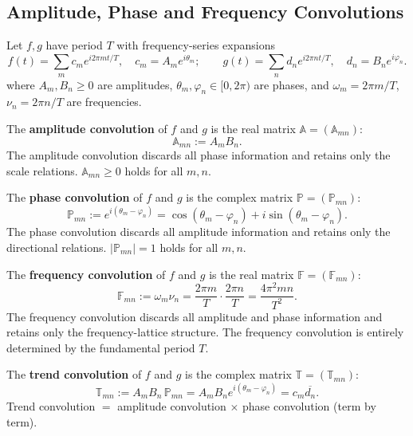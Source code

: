 \subsection{\texorpdfstring{Amplitude, Phase and Frequency Convolutions}{Amplitude, Phase and Frequency Convolutions}}

Let $f, g$ have period $T$ with frequency-series expansions
\[
f(t) = \sum_{m} c_m e^{i 2\pi m t/T}, \quad c_m = A_m e^{i\theta_m}; \qquad
g(t) = \sum_{n} d_n e^{i 2\pi n t/T}, \quad d_n = B_n e^{i\varphi_n}.
\]
where $A_m,B_n\ge 0$ are amplitudes, $\theta_m,\varphi_n\in[0,2\pi)$ are phases, and $\omega_m=2\pi m/T$, $\nu_n=2\pi n/T$ are frequencies.

\begin{definition}\label{def:amplitude_convolution}
The \textbf{amplitude convolution} of $f$ and $g$ is the real matrix $\mathbb{A} = (\mathbb{A}_{mn})$:
\[
\mathbb{A}_{mn} := A_m B_n.
\]
The amplitude convolution discards all phase information and retains only the scale relations. $\mathbb{A}_{mn} \ge 0$ holds for all $m, n$.
\end{definition}

\begin{definition}\label{def:phase_convolution}
The \textbf{phase convolution} of $f$ and $g$ is the complex matrix $\mathbb{P} = (\mathbb{P}_{mn})$:
\[
\mathbb{P}_{mn} := e^{i(\theta_m - \varphi_n)} = \cos(\theta_m - \varphi_n) + i\sin(\theta_m - \varphi_n).
\]
The phase convolution discards all amplitude information and retains only the directional relations. $|\mathbb{P}_{mn}| = 1$ holds for all $m, n$.
\end{definition}

\begin{definition}\label{def:frequency_convolution}
The \textbf{frequency convolution} of $f$ and $g$ is the real matrix $\mathbb{F} = (\mathbb{F}_{mn})$:
\[
\mathbb{F}_{mn} := \omega_m \nu_n = \frac{2\pi m}{T} \cdot \frac{2\pi n}{T} = \frac{4\pi^2 mn}{T^2}.
\]
The frequency convolution discards all amplitude and phase information and retains only the frequency-lattice structure. The frequency convolution is entirely determined by the fundamental period $T$.
\end{definition}

\begin{definition}\label{def:tendency_convolution}
The \textbf{trend convolution} of $f$ and $g$ is the complex matrix $\mathbb{T} = (\mathbb{T}_{mn})$:
\[
\mathbb{T}_{mn} := A_m B_n \, \mathbb{P}_{mn} = A_m B_n e^{i(\theta_m - \varphi_n)} = c_m \overline{d_n}.
\]
Trend convolution $=$ amplitude convolution $\times$ phase convolution (term by term).
\end{definition}

